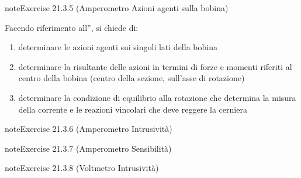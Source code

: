 \documentclass[letterpaper,10pt,italian]{jupyterBook}
\begin{document}
\begin{sphinxadmonition}{note}{Exercise 21.3.5 (Amperometro \sphinxhyphen{} Azioni agenti sulla bobina)}



\sphinxAtStartPar
Facendo riferimento all”{\hyperref[\detokenize{ch/electromagnetism/electromagnetism-steady:physics-hs-electromagnetism-electromagnetism-steady-experience-faraday-amperometer}]{}}, si chiede di:
\begin{enumerate}
%
\item {} 
\sphinxAtStartPar
determinare le azioni agenti sui singoli lati della bobina

\item {} 
\sphinxAtStartPar
determinare la risultante delle azioni in termini di forze e momenti riferiti al centro della bobina (centro della sezione, sull’asse di rotazione)

\item {} 
\sphinxAtStartPar
determinare la condizione di equilibrio alla rotazione che determina la misura della corrente e le reazioni vincolari che deve reggere la cerniera

\end{enumerate}
\end{sphinxadmonition}
 \label{exercise:ch/electromagnetism/electromagnetism-steady-problems-exercise-1}

\begin{sphinxadmonition}{note}{Exercise 21.3.6 (Amperometro \sphinxhyphen{} Intrusività)}


\end{sphinxadmonition}
 \label{exercise:ch/electromagnetism/electromagnetism-steady-problems-exercise-2}

\begin{sphinxadmonition}{note}{Exercise 21.3.7 (Amperometro \sphinxhyphen{} Sensibilità)}


\end{sphinxadmonition}
 \label{exercise:ch/electromagnetism/electromagnetism-steady-problems-exercise-3}

\begin{sphinxadmonition}{note}{Exercise 21.3.8 (Voltmetro \sphinxhyphen{} Intrusività)}


\end{sphinxadmonition}
\end{document}

